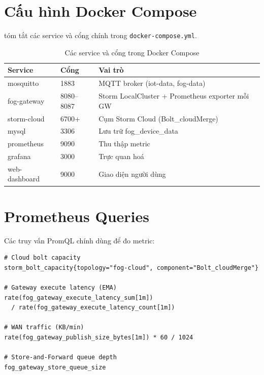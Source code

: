 \documentclass[13pt,a4paper]{report}
\newcommand{\code}[1]{\texttt{\small #1}}
\begin{document}
\chapter{Cấu hình Docker Compose}
\label{app:compose}

 tóm tắt các service và cổng chính trong
\code{docker-compose.yml}.

\begin{table}[H]
\centering
\caption{Các service và cổng trong Docker Compose}
\label{tab:compose}
\small
\begin{tabular}{p{} p{} p{}}
\toprule
\textbf{Service} & \textbf{Cổng} & \textbf{Vai trò} \\
\midrule
mosquitto      & 1883       & MQTT broker (iot-data, fog-data) \\
fog-gateway    & 8080--8087 & Storm LocalCluster + Prometheus exporter mỗi GW \\
storm-cloud    & 6700+      & Cụm Storm Cloud (Bolt\_cloudMerge) \\
mysql          & 3306       & Lưu trữ fog\_device\_data \\
prometheus     & 9090       & Thu thập metric \\
grafana        & 3000       & Trực quan hoá \\
web-dashboard  & 9000       & Giao diện người dùng \\
\bottomrule
\end{tabular}
\end{table}

\chapter{Prometheus Queries}
\label{app:promql}

Các truy vấn PromQL chính dùng để đo metric:

\begin{lstlisting}[caption={Các PromQL query chính}]
# Cloud bolt capacity
storm_bolt_capacity{topology="fog-cloud", component="Bolt_cloudMerge"}

# Gateway execute latency (EMA)
rate(fog_gateway_execute_latency_sum[1m])
  / rate(fog_gateway_execute_latency_count[1m])

# WAN traffic (KB/min)
rate(fog_gateway_publish_size_bytes[1m]) * 60 / 1024

# Store-and-Forward queue depth
fog_gateway_store_queue_size
\end{lstlisting}
\end{document}
